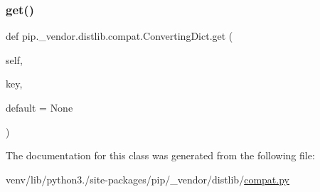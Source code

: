 \mbox{\label{classpip_1_1__vendor_1_1distlib_1_1compat_1_1ConvertingDict_acc9b853aa7f196de678588c6234fa60c}} 
\subsubsection{\texorpdfstring{get()}{get()}}
{\footnotesize\ttfamily def pip.\+\_\+vendor.\+distlib.\+compat.\+Converting\+Dict.\+get (\begin{DoxyParamCaption}\item[{}]{self,  }\item[{}]{key,  }\item[{}]{default = {\ttfamily None} }\end{DoxyParamCaption})}



The documentation for this class was generated from the following file\+:\begin{DoxyCompactItemize}
\item 
venv/lib/python3./site-\/packages/pip/\+\_\+vendor/distlib/\hyperlink{__vendor_2distlib_2compat_8py}{compat.\+py}\end{DoxyCompactItemize}
